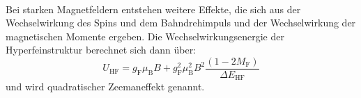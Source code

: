 %
%
\\Bei starken Magnetfeldern entstehen weitere Effekte, die sich aus der Wechselwirkung des Spins und dem Bahndrehimpuls und der Wechselwirkung der magnetischen Momente ergeben.
Die Wechselwirkungsenergie der Hyperfeinstruktur berechnet sich dann über:
\begin{equation}
U_{\text{HF}}= g_{\text{F}} \mu_{\text{B}} B + g_{\text{F}}^2 \mu_{\text{B}}^2 B^2 \frac{(1- 2M_{\text{F}})}{\Delta E_{\text{HF}}}
\label{eqn:quadzeeman}
\end{equation}
und wird quadratischer Zeemaneffekt genannt.
